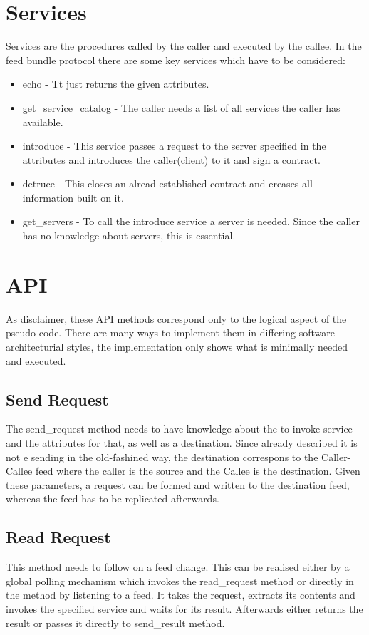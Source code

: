 \section{Services}
Services are the procedures called by the caller and executed by the callee. In the feed bundle protocol there are some key services which have to be considered:
\begin{itemize}
    \item echo - Tt just returns the given attributes.
    \item get\_service\_catalog - The caller needs a list of all services the caller has available.
    \item introduce - This service passes a request to the server specified in the attributes and introduces the caller(client) to it and sign a contract.
    \item detruce - This closes an alread established contract and ereases all information built on it.
    \item get\_servers - To call the introduce service a server is needed. Since the caller has no knowledge about servers, this is essential.
\end{itemize}
\section{API}
As disclaimer, these API methods correspond only to the logical aspect of the pseudo code. There are many ways to implement them in differing software-architecturial styles, the implementation only shows what is minimally needed and executed.
\subsection{Send Request}


The send\_request method needs to have knowledge about the to invoke service and the attributes for that, as well as a destination. Since already described it is not e sending in the old-fashined way, the destination correspons to the Caller-Callee feed where the caller is the source and the Callee is the destination. Given these parameters, a request can be formed and written to the destination feed, whereas the feed has to be replicated afterwards. 
\subsection{Read Request}

This method needs to follow on a feed change. This can be realised either by a global polling mechanism which invokes the read\_request method or directly in the method by listening to a feed. It takes the request, extracts its contents and invokes the specified service and waits for its result. Afterwards either returns the result or passes it directly to send\_result method.
